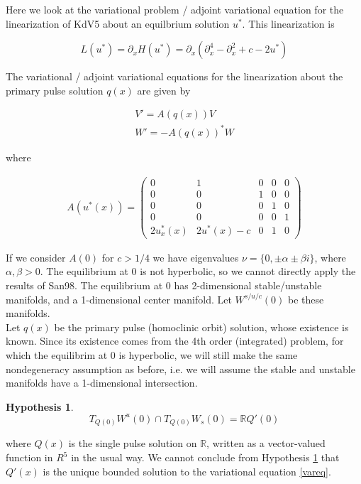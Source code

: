 \documentclass[12pt]{article}
\def\R{{\mathbb R}}
\newtheorem{hypothesis}{Hypothesis}
\begin{document}
Here we look at the variational problem / adjoint variational equation for the linearization of KdV5 about an equilbrium solution $u^*$. This linearization is

\begin{equation}
L(u^*) = \partial_x H(u^*) = \partial_x ( \partial_x^4 - \partial_x^2 + c - 2 u^*)
\end{equation}

The variational / adjoint variational equations for the linearization about the primary pulse solution $q(x)$ are given by

\begin{align}
V' = A(q(x))V \label{vareq} \\
W' = -A(q(x))^*W \label{adjvareq}
\end{align}

where

\begin{align}
A(u^*(x)) = \begin{pmatrix}0 & 1 & 0 & 0 & 0 \\0 & 0 & 1 & 0 & 0 \\0 & 0 & 0 & 1 & 0 \\0 & 0 & 0 & 0 & 1 \\
2u^*_x(x) & 2u^*(x) - c & 0 & 1 & 0 \end{pmatrix}
\end{align}

If we consider $A(0)$ for $c > 1/4$ we have eigenvalues $\nu = \{ 0, \pm \alpha \pm \beta i\}$, where $\alpha, \beta > 0$. The equilibrium at 0 is not hyperbolic, so we cannot directly apply the results of San98. The equilibrium at 0 has 2-dimensional stable/unstable manifolds, and a 1-dimensional center manifold. Let $W^{s/u/c}(0)$ be these manifolds.\\

Let $q(x)$ be the primary pulse (homoclinic orbit) solution, whose existence is known. Since its existence comes from the 4th order (integrated) problem, for which the equilibrim at 0 is hyperbolic, we will still make the same nondegeneracy assumption as before, i.e. we will assume the stable and unstable manifolds have a 1-dimensional intersection.

\begin{hypothesis}\label{nondegen}
\[
T_{Q(0)} W^u(0) \cap T_{Q(0)} W_s(0) = \R Q'(0)
\]
\end{hypothesis}

where $Q(x)$ is the single pulse solution on $\R$, written as a vector-valued function in $R^5$ in the usual way. We cannot conclude from Hypothesis \ref{nondegen} that $Q'(x)$ is the unique bounded solution to the variational equation \eqref{vareq}.\\
\end{document}
